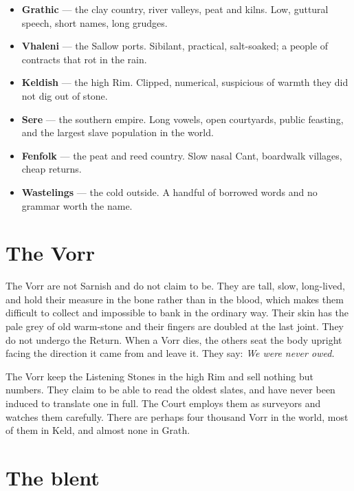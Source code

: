 \documentclass{design/chronicle}
\begin{document}
\begin{itemize}[leftmargin=1.4em,itemsep=1pt,topsep=3pt,parsep=0pt]

\item \textbf{Grathic} — the clay country, river valleys, peat and kilns. Low, guttural speech, short names, long grudges.

\item \textbf{Vhaleni} — the Sallow ports. Sibilant, practical, salt-soaked; a people of contracts that rot in the rain.

\item \textbf{Keldish} — the high Rim. Clipped, numerical, suspicious of warmth they did not dig out of stone.

\item \textbf{Sere} — the southern empire. Long vowels, open courtyards, public feasting, and the largest slave population in the world.

\item \textbf{Fenfolk} — the peat and reed country. Slow nasal Cant, boardwalk villages, cheap returns.

\item \textbf{Wastelings} — the cold outside. A handful of borrowed words and no grammar worth the name.

\end{itemize}

\section*{The Vorr}

The Vorr are not Sarnish and do not claim to be. They are tall, slow, long-lived, and hold their measure in the bone rather than in the blood, which makes them difficult to collect and impossible to bank in the ordinary way. Their skin has the pale grey of old warm-stone and their fingers are doubled at the last joint. They do not undergo the Return. When a Vorr dies, the others seat the body upright facing the direction it came from and leave it. They say: \emph{We were never owed.}

The Vorr keep the Listening Stones in the high Rim and sell nothing but numbers. They claim to be able to read the oldest slates, and have never been induced to translate one in full. The Court employs them as surveyors and watches them carefully. There are perhaps four thousand Vorr in the world, most of them in Keld, and almost none in Grath.

\section*{The blent}
\end{document}
